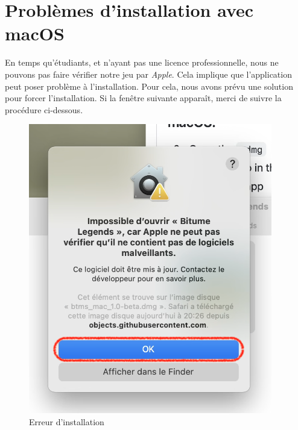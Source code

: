 \documentclass[a4paper,12pt]{article}
\begin{document}
    \section{Problèmes d'installation avec macOS}
        En temps qu'étudiants, et n'ayant pas une licence professionnelle, nous ne pouvons 
        pas faire vérifier notre jeu par \textsl{Apple}.
        Cela implique que l'application peut poser problème à l'installation.
        Pour cela, nous avons prévu une solution pour forcer l'installation.
        Si la fenêtre suivante apparaît, merci de suivre la procédure ci-dessous.
        \begin{figure}[h]
            \centering
            \includegraphics[scale=0.8]{install_mac_error.png}
            \caption{Erreur d'installation}
        \end{figure}
    
\end{document}

